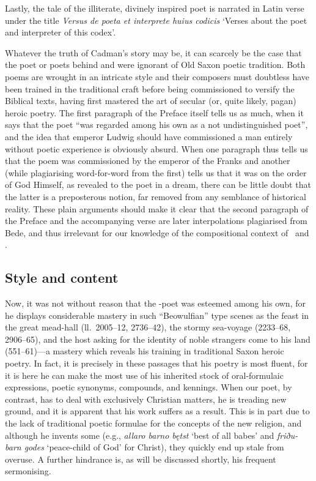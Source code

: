 Lastly, the tale of the illiterate, divinely inspired poet is narrated in Latin verse under the title \emph{Versus de poeta et interprete huius codicis} ‘Verses about the poet and interpreter of this codex’.

Whatever the truth of Cadman’s story may be, it can scarcely be the case that the poet or poets behind  and  were ignorant of Old Saxon poetic tradition.  Both poems are wrought in an intricate style and their composers must doubtless have been trained in the traditional craft before being commissioned to versify the Biblical texts, having first mastered the art of secular (or, quite likely, pagan) heroic poetry.  The first paragraph of the Preface itself tells us as much, when it says that the poet “was regarded among his own as a not undistinguished poet”, and the idea that emperor Ludwig should have commissioned a man entirely without poetic experience is obviously absurd.
When one paragraph thus tells us that the poem was commissioned by the emperor of the Franks and another (while plagiarising word-for-word from the first) tells us that it was on the order of God Himself, as revealed to the poet in a dream, there can be little doubt that the latter is a preposterous notion, far removed from any semblance of historical reality.
These plain arguments should make it clear that the second paragraph of the Preface and the accompanying verse are later interpolations plagiarised from Bede, and thus irrelevant for our knowledge of the compositional context of \Heliand\ and .

\subsection{Style and content}

Now, it was not without reason that the \Heliand-poet was esteemed among his own, for he displays considerable mastery in such “Beowulfian” type scenes as the feast in the great mead-hall (ll.~2005--12, 2736--42), the stormy sea-voyage (2233--68, 2906--65), and the host asking for the identity of noble strangers come to his land (551--61)---a mastery which reveals his training in traditional Saxon heroic poetry.
In fact, it is precisely in these passages that his poetry is most fluent, for it is here he can make the most use of his inherited stock of oral-formulaic expressions, poetic synonyms, compounds, and kennings.  When our poet, by contrast, has to deal with exclusively Christian matters, he is treading new ground, and it is apparent that his work suffers as a result.  This is in part due to the lack of traditional poetic formulae for the concepts of the new religion, and although he invents some (e.g., \emph{allaro barno bętst} ‘best of all babes’ and \emph{friðu-barn godes} ‘peace-child of God’ for Christ), they quickly end up stale from overuse.  A further hindrance is, as will be discussed shortly, his frequent sermonising.

